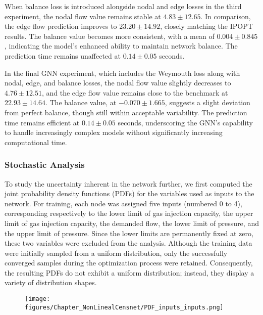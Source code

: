 When balance loss is introduced alongside nodal and edge losses in the third experiment, the nodal flow value remains stable at \( 4.83 \pm 12.65 \). In comparison, the edge flow prediction improves to \( 23.20 \pm 14.92 \), closely matching the IPOPT results. The balance value becomes more consistent, with a mean of \( 0.004 \pm 0.845 \), indicating the model's enhanced ability to maintain network balance. The prediction time remains unaffected at \( 0.14 \pm 0.05 \) seconds.

In the final GNN experiment, which includes the Weymouth loss along with nodal, edge, and balance losses, the nodal flow value slightly decreases to \( 4.76 \pm 12.51 \), and the edge flow value remains close to the benchmark at \( 22.93 \pm 14.64 \). The balance value, at \( -0.070 \pm 1.665 \), suggests a slight deviation from perfect balance, though still within acceptable variability. The prediction time remains efficient at \( 0.14 \pm 0.05 \) seconds, underscoring the GNN's capability to handle increasingly complex models without significantly increasing computational time.


\subsubsection{Stochastic Analysis}
To study the uncertainty inherent in the network further, we first computed the joint probability density functions (PDFs) for the variables used as inputs to the network. For training, each node was assigned five inputs (numbered 0 to 4), corresponding respectively to the lower limit of gas injection capacity, the upper limit of gas injection capacity, the demanded flow, the lower limit of pressure, and the upper limit of pressure. Since the lower limits are permanently fixed at zero, these two variables were excluded from the analysis. Although the training data were initially sampled from a uniform distribution, only the successfully converged samples during the optimization process were retained. Consequently, the resulting PDFs do not exhibit a uniform distribution; instead, they display a variety of distribution shapes.


\begin{figure}
    \begin{center}
        \texttt{[image: figures/Chapter\_NonLinealCensnet/PDF\_inputs\_inputs.png]}
    \end{center}
    \caption{}\label{fig:joint_distributions_input_input}
\end{figure}
     


